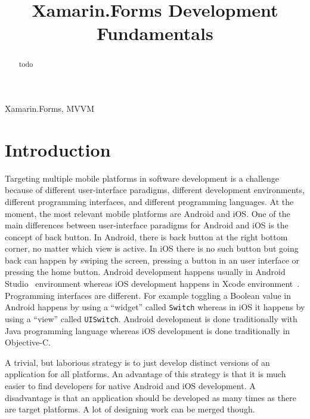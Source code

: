 \documentclass[conference]{IEEEtran}
\begin{document}
\title{Xamarin.Forms Development Fundamentals}

\author{
}

\maketitle

\begin{abstract}
  todo
\end{abstract}

\begin{IEEEkeywords}
  Xamarin.Forms, MVVM
\end{IEEEkeywords}

\section{Introduction}

Targeting multiple mobile platforms in software development is a challenge because of different user-interface paradigms, different development environments, different programming interfaces, and different programming languages. At the moment, the most relevant mobile platforms are Android and iOS. One of the main differences between user-interface paradigms for Android and iOS is the concept of back button. In Android, there is back button at the right bottom corner, no matter which view is active. In iOS there is no such button but going back can happen by swiping the screen, pressing a button in an user interface or pressing the home button. Android development happens usually in Android Studio~\cite{androidstudio} environment whereas iOS development happens in Xcode environment~\cite{xcode}. Programming interfaces are different. For example toggling a Boolean value in Android happens by using a ``widget'' called \texttt{Switch} whereas in iOS it happens by using a ``view'' called \texttt{UISwitch}. Android development is done traditionally with Java programming language whereas iOS development is done traditionally in Objective-C.

A trivial, but laborious strategy is to just develop distinct versions of an application for all platforms. An advantage of this strategy is that it is much easier to find developers for native Android and iOS development. A disadvantage is that an application should be developed as many times as there are target platforms. A lot of designing work can be merged though.
\end{document}
